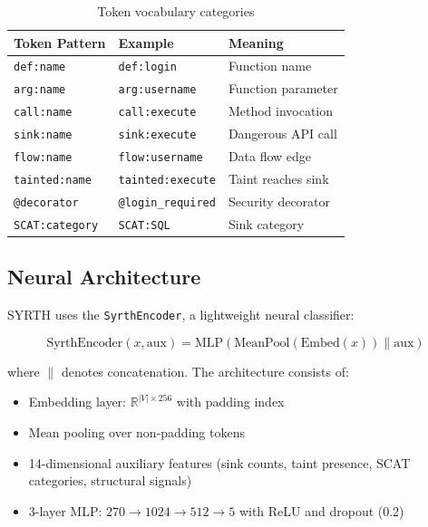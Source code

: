 \documentclass[12pt,a4paper]{article}
\begin{document}
\begin{table}[h]
\centering
\caption{Token vocabulary categories}
\label{tab:tokens}
\begin{tabular}{@{}lll@{}}
\toprule
Token Pattern & Example & Meaning \\
\midrule
\texttt{def:name} & \texttt{def:login} & Function name \\
\texttt{arg:name} & \texttt{arg:username} & Function parameter \\
\texttt{call:name} & \texttt{call:execute} & Method invocation \\
\texttt{sink:name} & \texttt{sink:execute} & Dangerous API call \\
\texttt{flow:name} & \texttt{flow:username} & Data flow edge \\
\texttt{tainted:name} & \texttt{tainted:execute} & Taint reaches sink \\
\texttt{@decorator} & \texttt{@login\_required} & Security decorator \\
\texttt{SCAT:category} & \texttt{SCAT:SQL} & Sink category \\
\bottomrule
\end{tabular}
\end{table}

\subsection{Neural Architecture}
\label{sec:architecture}

SYRTH uses the \texttt{SyrthEncoder}, a lightweight neural classifier:

\begin{equation}
\text{SyrthEncoder}(x, \text{aux}) = \text{MLP}\left(\text{MeanPool}(\text{Embed}(x)) \| \text{aux}\right)
\end{equation}

where $\|$ denotes concatenation. The architecture consists of:
\begin{itemize}
    \item Embedding layer: $\mathbb{R}^{|V| \times 256}$ with padding index
    \item Mean pooling over non-padding tokens
    \item 14-dimensional auxiliary features (sink counts, taint presence, SCAT categories, structural signals)
    \item 3-layer MLP: $270 \rightarrow 1024 \rightarrow 512 \rightarrow 5$ with ReLU and dropout (0.2)
\end{itemize}
\end{document}
